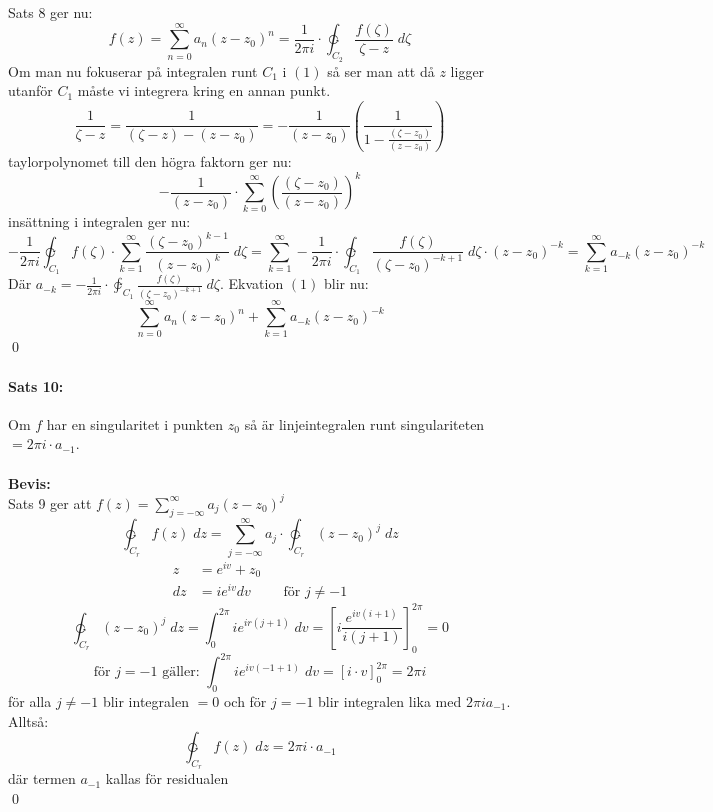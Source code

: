 \documentclass{article}%
\begin{document}
Sats 8 ger nu:
\[
	f(z) = \sum_{n = 0}^\infty a_n (z - z_0)^n = \frac {1} {2 \pi i} \cdot \ointctrclockwise_{C_2} \frac 
		{f(\zeta)} {\zeta - z} \; d\zeta
\]
Om man nu fokuserar på integralen runt $C_1$ i $(1)$ så ser man att då $z$ ligger utanför $C_1$ 
måste vi integrera kring en annan punkt.
\[
	\frac {1} {\zeta - z} = \frac {1} {(\zeta - z) - (z - z_0)} = - \frac {1} {(z - z_0)}
		\left (
			\frac {1} {1 - \frac {(\zeta - z_0)} {(z - z_0)}}
		\right )
\]
taylorpolynomet till den högra faktorn ger nu:
\[
	- \frac {1} {(z - z_0)} \cdot \sum_{k = 0}^\infty
		\left (
			\frac {(\zeta - z_0)} {(z - z_0)}
		\right )^k
\]
insättning i integralen ger nu:
\[ %
	- \frac {1} {2 \pi i} \varointclockwise_{C_1} f(\zeta) \cdot \sum_{k = 1}^\infty \frac {(\zeta - z_0)^{k - 1}} {(z - z_0)^k} \; d\zeta
	= \sum_{k = 1}^\infty -\frac{1} {2 \pi i} \cdot \varointclockwise_{C_1} \frac {f(\zeta)} {(\zeta - z_0)^{-k + 1}} \; d\zeta \cdot
			(z - z_0)^{-k} = \sum_{k = 1}^\infty a_{-k} (z - z_0)^{-k}
\] %
Där $a_{-k} = -\frac{1} {2 \pi i} \cdot \varointclockwise_{C_1} \frac {f(\zeta)} {(\zeta - z_0)^{-k + 1}} \; d\zeta$.
Ekvation $(1)$ blir nu:
\[
	\sum_{n = 0}^\infty a_n(z - z_0)^n + \sum_{k = 1}^\infty a_{-k}(z - z_0)^{-k}
\]
\hfill \qed

\paragraph{Sats 10:}
Om $f$ har en singularitet i punkten $z_0$ så är linjeintegralen runt singulariteten $= 2 \pi i \cdot a_{-1}$.\\
\\
{\bf Bevis:}\\
Sats 9 ger att $f(z) = \sum\limits_{j = - \infty}^\infty a_j (z - z_0)^j$
\[
	\ointctrclockwise_{C_r} f(z) \; dz = \sum_{j = - \infty}^\infty a_j \cdot \ointctrclockwise_{C_r} (z - z_0)^j \; dz
\]
\begin{align*}
	z &= e^{iv} + z_0 \\
	dz &= ie^{iv} dv \qquad \text{ för } j \neq - 1
\end{align*}
\[
	\ointctrclockwise_{C_r} (z - z_0)^j \; dz = \int_0^{2 \pi} ie^{ir(j + 1)} \; dv =
	\left [
		i \frac {e^{iv(i + 1)}} {i (j + 1)}
	\right ]_0^{2 \pi}
	= 0
\]
\[
	\text{för } j = -1 \text{ gäller: } \int_0^{2\pi} ie^{iv(-1 + 1)} \; dv = 
	\left [
		i \cdot v
	\right ]_0^{2\pi}
	= 2 \pi i
\]
för alla $j \neq -1$ blir integralen $ = 0$ och för $j = -1$ blir integralen lika med $2 \pi i a_{- 1}$.
Alltså:
\[
	\ointctrclockwise_{C_r} f(z) \; dz = 2 \pi i \cdot a_{-1}
\]
där termen $a_{-1}$ kallas för residualen \\
\hfill \qed
\end{document}
